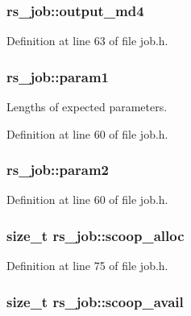 \subsubsection[{output\+\_\+md4}]{ rs\+\_\+job\+::output\+\_\+md4}\label{structrs__job_a29f5436987f3f517ad6d2dab32540d45}


Definition at line 63 of file job.\+h.

\hypertarget{structrs__job_af211b70e91e587c46cd8350c299722f9}{}
\subsubsection[{param1}]{ rs\+\_\+job\+::param1}\label{structrs__job_af211b70e91e587c46cd8350c299722f9}
Lengths of expected parameters. 

Definition at line 60 of file job.\+h.

\hypertarget{structrs__job_a8cb89913609148b6005a8cd5d050b267}{}
\subsubsection[{param2}]{ rs\+\_\+job\+::param2}\label{structrs__job_a8cb89913609148b6005a8cd5d050b267}


Definition at line 60 of file job.\+h.

\hypertarget{structrs__job_a7ccd19f59c6378dbe92b679456e3a1ec}{}
\subsubsection[{scoop\+\_\+alloc}]{\setlength{\rightskip}{0pt plus 5cm}size\+\_\+t rs\+\_\+job\+::scoop\+\_\+alloc}\label{structrs__job_a7ccd19f59c6378dbe92b679456e3a1ec}


Definition at line 75 of file job.\+h.

\hypertarget{structrs__job_ac65cbe513f5b988a5abe64df4f7cda4f}{}
\subsubsection[{scoop\+\_\+avail}]{\setlength{\rightskip}{0pt plus 5cm}size\+\_\+t rs\+\_\+job\+::scoop\+\_\+avail}\label{structrs__job_ac65cbe513f5b988a5abe64df4f7cda4f}


